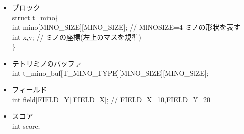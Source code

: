 \begin{itemize}
  \item ブロック\\ \mbox{}
        struct t\_mino\{\\
          int mino[MINO\_SIZE][MINO\_SIZE]; // MINOSIZE=4 ミノの形状を表す\\
          int x,y; // ミノの座標(左上のマスを規準)\\
        \}
  \item テトリミノのバッファ\\ \mbox{}
    int t\_mino\_buf[T\_MINO\_TYPE][MINO\_SIZE][MINO\_SIZE];
  \item フィールド\\ \mbox{}
        int field[FIELD\_Y][FIELD\_X]; // FIELD\_X=10,FIELD\_Y=20
  \item スコア\\ \mbox{}
        int score;
\end{itemize}
